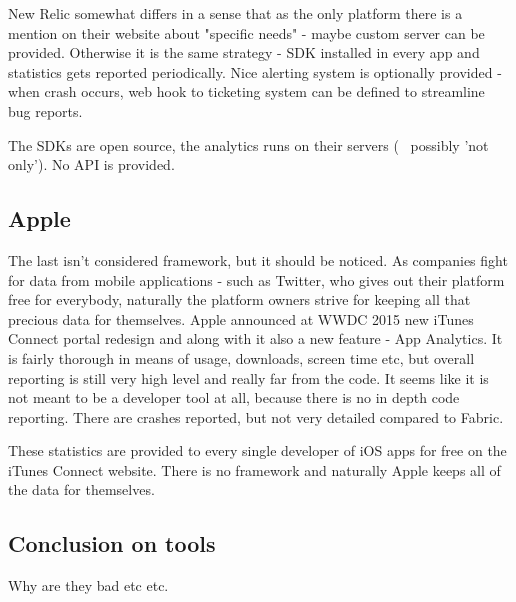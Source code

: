 New Relic somewhat differs in a sense that as the only platform there is a mention on their website about "specific needs" - maybe custom server can be provided. Otherwise it is the same strategy - SDK installed in every app and statistics gets reported periodically. Nice alerting system is optionally provided - when crash occurs, web hook to ticketing system can be defined to streamline bug reports.

The SDKs are open source, the analytics runs on their servers (~ possibly 'not only'). No API is provided.


\subsection{Apple}

The last isn't considered framework, but it should be noticed. As companies fight for data from mobile applications - such as Twitter, who gives out their platform free for everybody, naturally the platform owners strive for keeping all that precious data for themselves. Apple announced at WWDC 2015 new iTunes Connect portal redesign and along with it also a new feature - App Analytics. It is fairly thorough in means of usage, downloads, screen time etc, but overall reporting is still very high level and really far from the code. It seems like it is not meant to be a developer tool at all, because there is no in depth code reporting. There are crashes reported, but not very detailed compared to Fabric.

These statistics are provided to every single developer of iOS apps for free on the iTunes Connect website. There is no framework and naturally Apple keeps all of the data for themselves.


\subsection*{Conclusion on tools}

Why are they bad etc etc.